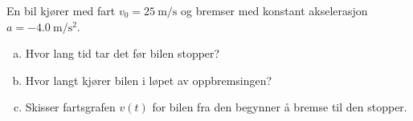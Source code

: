 %
En bil kjører med fart $v_0 = \SI{25}{\metre\per\second}$ og bremser med konstant akselerasjon $a = -\SI{4.0}{\metre\per\second\squared}$.
\begin{enumerate}[a)]
    \item Hvor lang tid tar det før bilen stopper?
    \item Hvor langt kjører bilen i løpet av oppbremsingen?
    \item Skisser fartsgrafen $v(t)$ for bilen fra den begynner å bremse til den stopper.
\end{enumerate}
